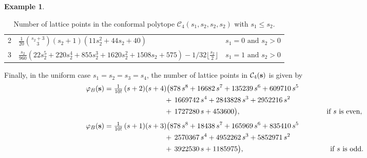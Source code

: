 \documentclass[12pt,a4paper]{extarticle}
\theoremstyle{definition}
\newtheorem{example}[theorem]{Example}
\begin{document}
\begin{example}
\begin{table}[h]
\begin{tabular}{c p{10cm} p{4cm}}
2 &
$\tfrac{1}{20}{s_2 + 3 \choose 3}(s_2+1)(11s_2^2+44s_2+40)$ &
$
 s_1=0 \text{ and } s_2 > 0
$ \\

3 &
$\tfrac{s_2}{960}(22s_2^5+220s_2^4+855s_2^3+1620s_2^2+1508s_2+575) - 1/32 \lfloor \tfrac{s_2}{2} \rfloor $ &
$
 s_1=1 \text{ and } s_2>0
$ \\[1pt]
\hline
\end{tabular}
\caption{Number of lattice points in the conformal polytope 
$
\mathcal{C}_4(s_1,s_2,s_2,s_2)$ with $s_1\le s_2$.
}
\label{tab: C4 chambers}
\end{table}
Finally, in the uniform case $s_1=s_2=s_3=s_4$, the number of lattice points in $\mathcal{C}_4({\bf s})$ is given by
\begin{align*}
\varphi_B({\bf s}) &= \tfrac{1}{10!}\, (s+2)(s+4)\bigl(
        878\,s^{8}+16682\,s^{7}+135239\,s^{6}+609710\,s^{5} \\
     &\hspace{8.4em} +\,1669742\,s^{4}+2843828\,s^{3}+2952216\,s^{2} \\
     &\hspace{8.4em} +\,1727280\,s+453600\bigr),
        \qquad  \qquad \qquad \qquad \qquad \qquad \text{if }s\text{ is even}, \\[4pt]
\varphi_B({\bf s}) &= \tfrac{1}{10!}\,(s+1)(s+3)\bigl(
        878\,s^{8}+18438\,s^{7}+165969\,s^{6}+835410\,s^{5} \\
     &\hspace{8.4em} +\,2570367\,s^{4}+4952262\,s^{3}+5852971\,s^{2} \\
     &\hspace{8.4em} +\,3922530\,s+1185975\bigr),
        \qquad  \qquad \qquad \qquad \qquad \qquad \text{if }s\text{ is odd}.
\end{align*}
\end{example}
\end{document}

